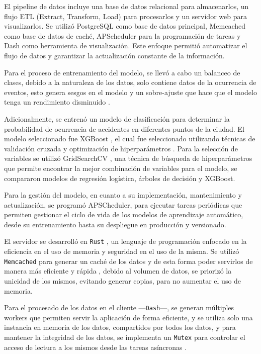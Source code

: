 \documentclass[12pt]{article}
\begin{document}
El pipeline de datos incluye una base de datos relacional para almacenarlos, un flujo ETL (Extract, Transform, Load) para procesarlos y un servidor web para visualizarlos. Se utilizó PostgreSQL \citep{postgres2025} como base de datos principal, Memcached  \citep{memcached2025} como base de datos de caché, APScheduler para la programación de tareas y Dash \citep{dash2025} como herramienta de visualización. Este enfoque permitió automatizar el flujo de datos y garantizar la actualización constante de la información.

Para el proceso de entrenamiento del modelo, se llevó a cabo un balanceo de clases, debido a la naturaleza de los datos, solo contiene datos de la ocurrencia de eventos, esto genera sesgos en el modelo y un sobre-ajuste que hace que el modelo tenga un rendimiento disminuido \citep{he2009learning}.

Adicionalmente, se entrenó un modelo de clasificación para determinar la probabilidad de ocurrencia de accidentes en diferentes puntos de la ciudad. El modelo seleccionado fue XGBoost \citep{chen2016xgboost}, el cual fue seleccionado utilizando técnicas de validación cruzada y optimización de hiperparámetros \citep{geron2019hands}. Para la selección de variables se utilizó GridSearchCV \citep{pedregosa2011scikit, geron2019hands}, una técnica de búsqueda de hiperparámetros que permite encontrar la mejor combinación de variables para el modelo, se compararon modelos de regresión logística, árboles de decisión y XGBoost.

Para la gestión del modelo, en cuanto a su implementación, mantenimiento y actualización, se programó APSCheduler, para ejecutar tareas periódicas que permiten gestionar el ciclo de vida de los modelos de aprendizaje automático, desde su entrenamiento hasta su despliegue en producción y versionado.

El servidor se desarrolló en \texttt{Rust} \citep{rust2025}, un lenguaje de programación enfocado en la eficiencia en el uso de memoria y seguridad en el uso de la misma. Se utilizó \texttt{Memcached} para generar un caché de los datos y de esta forma poder servirlos de manera más eficiente y rápida \citep{fitzpatrick2004memcached}, debido al volumen de datos, se priorizó la unicidad de los mismos, evitando generar copias, para no aumentar el uso de memoria.

Para el procesado de los datos en el cliente —\texttt{Dash}—, se generan múltiples workers que permiten servir la aplicación de forma eficiente, y se utiliza solo una instancia en memoria de los datos, compartidos por todos los datos, y para mantener la integridad de los datos, se implementa un \texttt{Mutex} para controlar el acceso de lectura a los mismos desde las tareas asíncronas \citep{ramalho2015fluent}.
\end{document}
